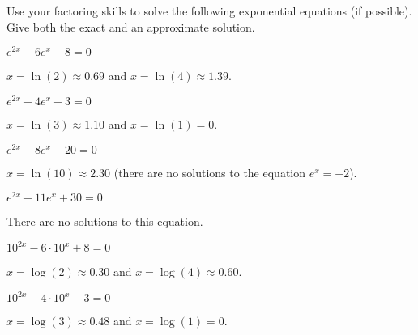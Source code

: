 \begin{exercises}
\begin{problem}[Factoring]
Use your factoring skills to solve the following exponential equations 
(if possible). Give both the exact and an approximate solution.
\begin{multicols}{4}
	\begin{subproblem}
		$e^{2x}-6e^x+8=0$ 
		\begin{shortsolution}
			$x=\ln(2)\approx 0.69$ and $x=\ln(4)\approx 1.39$.
		\end{shortsolution}
	\end{subproblem}
	\begin{subproblem}
		$e^{2x}-4e^x-3=0$ 
		\begin{shortsolution}
			$x=\ln(3)\approx 1.10$ and $x=\ln(1)=0$.
		\end{shortsolution}
	\end{subproblem}
	\begin{subproblem}
		$e^{2x}-8e^x-20=0$
		\begin{shortsolution}
			$x=\ln(10)\approx 2.30$ (there are no solutions to the equation $e^x=-2$).
		\end{shortsolution}
	\end{subproblem}
	\begin{subproblem}
		$e^{2x}+11e^x+30=0$
		\begin{shortsolution}
			There are no solutions to this equation.
		\end{shortsolution}
	\end{subproblem}
\end{multicols}
\begin{multicols}{4}
	\begin{subproblem}
		$10^{2x}-6\cdot 10^x+8=0$ 
		\begin{shortsolution}
			$x=\log(2)\approx 0.30$ and $x=\log(4)\approx 0.60$.
		\end{shortsolution}
	\end{subproblem}
	\begin{subproblem}
		$10^{2x}-4\cdot 10^x-3=0$ 
		\begin{shortsolution}
			$x=\log(3)\approx 0.48$ and $x=\log(1)=0$.
		\end{shortsolution}
	\end{subproblem}
	\begin{subproblem}

\end{subproblem}
\end{multicols}
\end{problem}
\end{exercises}
